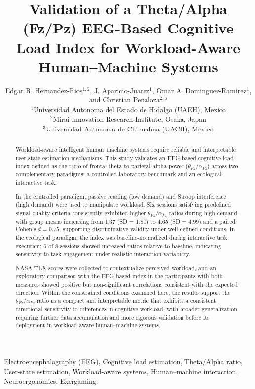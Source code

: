 \documentclass[conference]{IEEEtran}
\title{\LARGE \bf
Validation of a Theta/Alpha (Fz/Pz) EEG-Based Cognitive Load Index for Workload-Aware Human--Machine Systems
}
\author{%
\parbox{\linewidth}{\centering
Edgar R. Hernandez-Rios$^{1,2}$, J. Aparicio-Juarez$^{1}$, Omar A. Dominguez-Ramirez$^{1}$, and Christian Penaloza$^{2,3}$\\
\vspace{1mm}
$^{1}$Universidad Autonoma del Estado de Hidalgo (UAEH), Mexico\\
$^{2}$Mirai Innovation Research Institute, Osaka, Japan\\
$^{3}$Universidad Autonoma de Chihuahua (UACH), Mexico
}
%
}
\begin{document}
\maketitle
\thispagestyle{empty}
\pagestyle{empty}

\begin{abstract}
Workload-aware intelligent human--machine systems require reliable and interpretable user-state estimation mechanisms. This study validates an EEG-based cognitive load index defined as the ratio of frontal theta to parietal alpha power ($\theta_{Fz}/\alpha_{Pz}$) across two complementary paradigms: a controlled laboratory benchmark and an ecological interactive task.

In the controlled paradigm, passive reading (low demand) and Stroop interference (high demand) were used to manipulate workload. Six sessions satisfying predefined signal-quality criteria consistently exhibited higher $\theta_{Fz}/\alpha_{Pz}$ ratios during high demand, with group means increasing from 1.37 (SD = 1.80) to 4.65 (SD = 4.99) and a paired Cohen's $d=0.75$, supporting discriminative validity under well-defined conditions. In the ecological paradigm, the index was baseline-normalized during interactive task execution; 6 of 8 sessions showed increased ratios relative to baseline, indicating sensitivity to task engagement under realistic interaction variability.

NASA-TLX scores were collected to contextualize perceived workload, and an exploratory comparison with the EEG-based index in the participants with both measures showed positive but non-significant correlations consistent with the expected direction. Within the constrained conditions examined here, the results support the $\theta_{Fz}/\alpha_{Pz}$ ratio as a compact and interpretable metric that exhibits a consistent directional sensitivity to differences in cognitive workload, with broader generalization requiring further data accumulation and more rigorous validation before its deployment in workload-aware human--machine systems.
\end{abstract}

\begin{keywords}
Electroencephalography (EEG), Cognitive load estimation, Theta/Alpha ratio, User-state estimation, Workload-aware systems, Human--machine interaction, Neuroergonomics, Exergaming.
\end{keywords}
\end{document}
